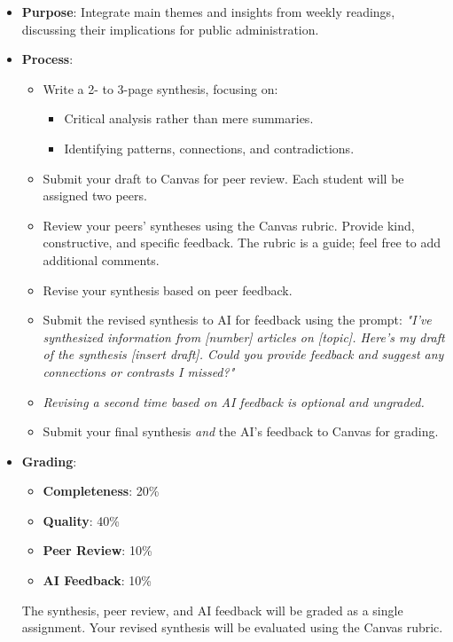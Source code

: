 \documentclass[12pt, letterpaper]{article}
\newenvironment{boldnumlist}
{\begin{enumerate}[label=\textbf{\arabic*.}]}
{\end{enumerate}}
\begin{document}
\begin{boldnumlist}
\begin{itemize}
    \item \textbf{Purpose}: Integrate main themes and insights from weekly readings, discussing their implications for public administration.
    \item \textbf{Process}:
    \begin{itemize}
        \item Write a 2- to 3-page synthesis, focusing on:
        \begin{itemize}
            \item Critical analysis rather than mere summaries.
            \item Identifying patterns, connections, and contradictions.
        \end{itemize}
        \item Submit your draft to Canvas for peer review. Each student will be assigned two peers.
        \item Review your peers' syntheses using the Canvas rubric. Provide kind, constructive, and specific feedback. The rubric is a guide; feel free to add additional comments.
        \item Revise your synthesis based on peer feedback.
        \item Submit the revised synthesis to AI for feedback using the prompt:
        \textit{"I've synthesized information from [number] articles on [topic]. Here's my draft of the synthesis [insert draft]. Could you provide feedback and suggest any connections or contrasts I missed?"}
        \item \emph{Revising a second time based on AI feedback is optional and ungraded.}
        \item Submit your final synthesis \emph{and} the AI's feedback to Canvas for grading.
    \end{itemize}
    \item \textbf{Grading}:
    \begin{itemize}
        \item \textbf{Completeness}: 20\%
        \item \textbf{Quality}: 40\%
        \item \textbf{Peer Review}: 10\%
        \item \textbf{AI Feedback}: 10\%
    \end{itemize}
    The synthesis, peer review, and AI feedback will be graded as a single assignment. Your revised synthesis will be evaluated using the Canvas rubric.
\end{itemize}


\end{boldnumlist}
\end{document}
